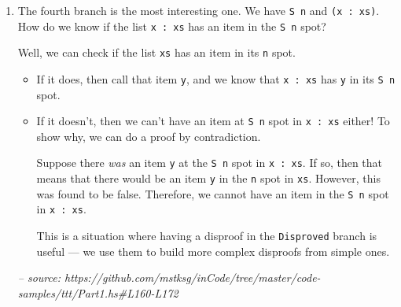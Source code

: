 \documentclass[]{article}
\newenvironment{Shaded}{}{}
\newcommand{\CommentTok}[1]{\textcolor[rgb]{0.38,0.63,0.69}{\textit{#1}}}
\newcommand{\DataTypeTok}[1]{\textcolor[rgb]{0.56,0.13,0.00}{#1}}
\newcommand{\FunctionTok}[1]{\textcolor[rgb]{0.02,0.16,0.49}{#1}}
\newcommand{\NormalTok}[1]{#1}
\newcommand{\OtherTok}[1]{\textcolor[rgb]{0.00,0.44,0.13}{#1}}
\begin{document}
\begin{enumerate}
\begin{Shaded}
\end{Shaded}
\item
  The fourth branch is the most interesting one. We have
  \texttt{\textquotesingle{}S\ n} and \texttt{(x\ \textquotesingle{}:\ xs)}. How
  do we know if the list \texttt{x\ \textquotesingle{}:\ xs} has an item in the
  \texttt{\textquotesingle{}S\ n} spot?

  Well, we can check if the list \texttt{xs} has an item in its \texttt{n} spot.

  \begin{itemize}
  \item
    If it does, then call that item \texttt{y}, and we know that
    \texttt{x\ \textquotesingle{}:\ xs} has \texttt{y} in its
    \texttt{\textquotesingle{}S\ n} spot.
  \item
    If it doesn't, then we can't have an item at \texttt{\textquotesingle{}S\ n}
    spot in \texttt{x\ \textquotesingle{}:\ xs} either! To show why, we can do a
    proof by contradiction.

    Suppose there \emph{was} an item \texttt{y} at the
    \texttt{\textquotesingle{}S\ n} spot in \texttt{x\ \textquotesingle{}:\ xs}.
    If so, then that means that there would be an item \texttt{y} in the
    \texttt{n} spot in \texttt{xs}. However, this was found to be false.
    Therefore, we cannot have an item in the \texttt{\textquotesingle{}S\ n}
    spot in \texttt{x\ \textquotesingle{}:\ xs}.

    This is a situation where having a disproof in the \texttt{Disproved} branch
    is useful --- we use them to build more complex disproofs from simple ones.
  \end{itemize}

\begin{Shaded}
\begin{Highlighting}[]
\CommentTok{-- source: https://github.com/mstksg/inCode/tree/master/code-samples/ttt/Part1.hs#L160-L172}


\end{Highlighting}
\end{Shaded}
\end{enumerate}
\end{document}
